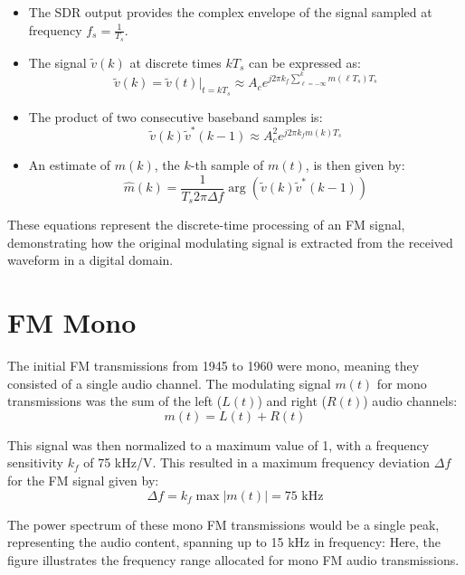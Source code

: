 \begin{itemize}
    \item The SDR output provides the complex envelope of the signal sampled at frequency \( f_s = \frac{1}{T_s} \).
    \item The signal \( \tilde{v}(k) \) at discrete times \( kT_s \) can be expressed as:
    \[
    \tilde{v}(k) = \tilde{v}(t)|_{t=kT_s} \approx A_c e^{j2\pi k_f \sum_{\ell=-\infty}^{k} m(\ell T_s) T_s}
    \]
    \item The product of two consecutive baseband samples is:
    \[
    \tilde{v}(k) \tilde{v}^*(k - 1) \approx A_c^2 e^{j2\pi k_f m(k) T_s}
    \]
    \item An estimate of \( m(k) \), the \( k \)-th sample of \( m(t) \), is then given by:
    \[
    \hat{m}(k) = \frac{1}{T_s 2\pi \Delta f} \arg(\tilde{v}(k) \tilde{v}^*(k - 1))
    \]
\end{itemize}

These equations represent the discrete-time processing of an FM signal, demonstrating how the original modulating signal is extracted from the received waveform in a digital domain.

\section*{FM Mono}

The initial FM transmissions from 1945 to 1960 were mono, meaning they consisted of a single audio channel. The modulating signal \( m(t) \) for mono transmissions was the sum of the left (\( L(t) \)) and right (\( R(t) \)) audio channels:
\[ m(t) = L(t) + R(t) \]

This signal was then normalized to a maximum value of 1, with a frequency sensitivity \( k_f \) of 75 kHz/V. This resulted in a maximum frequency deviation \( \Delta f \) for the FM signal given by:
\[ \Delta f = k_f \max|m(t)| = 75 \text{ kHz} \]

The power spectrum of these mono FM transmissions would be a single peak, representing the audio content, spanning up to 15 kHz in frequency:
Here, the figure illustrates the frequency range allocated for mono FM audio transmissions.

